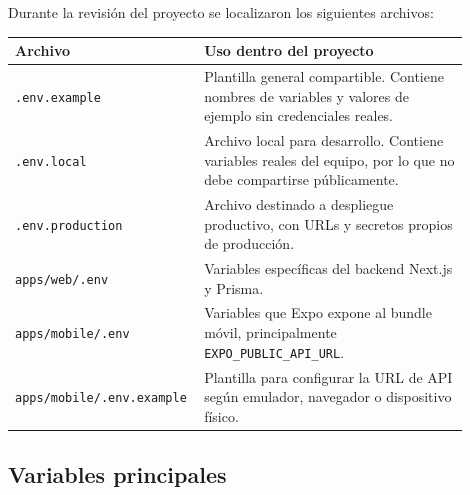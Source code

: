 \documentclass[12pt,a4paper]{article}
\begin{document}
Durante la revisión del proyecto se localizaron los siguientes archivos:

\begin{longtable}{p{0.32\linewidth}p{0.58\linewidth}}
\toprule
\textbf{Archivo} & \textbf{Uso dentro del proyecto} \\
\midrule
\texttt{.env.example} & Plantilla general compartible. Contiene nombres de variables y valores de ejemplo sin credenciales reales. \\
\texttt{.env.local} & Archivo local para desarrollo. Contiene variables reales del equipo, por lo que no debe compartirse públicamente. \\
\texttt{.env.production} & Archivo destinado a despliegue productivo, con URLs y secretos propios de producción. \\
\texttt{apps/web/.env} & Variables específicas del backend Next.js y Prisma. \\
\texttt{apps/mobile/.env} & Variables que Expo expone al bundle móvil, principalmente \texttt{EXPO\_PUBLIC\_API\_URL}. \\
\texttt{apps/mobile/.env.example} & Plantilla para configurar la URL de API según emulador, navegador o dispositivo físico. \\
\bottomrule
\end{longtable}

\subsection{Variables principales}
\end{document}
